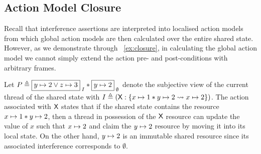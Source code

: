 \subsection{Action Model Closure}
Recall that interference assertions are interpreted into localised action models from which global action models are then calculated over the entire shared state. However, as we demonstrate through \ex~\ref{ex:closure}, in calculating the global action model we cannot simply extend the action pre- and post-conditions with arbitrary frames. 
%
\begin{example}[]\label{ex:closure}
Let $P \triangleq \boxed{y \mapsto 2 \lor z \mapsto 3}_{\; I} * \boxed{y \mapsto 2}_{\; \emptyset}$ denote the subjective view of the current thread of the shared state with $I \triangleq (\textsf{X}: \left\{x \mapsto 1 * y \mapsto 2 \rightsquigarrow x \mapsto 2\right\})$. The action associated with $\textsf{X}$ states that if the shared state contains the resource $x \mapsto 1 * y \mapsto 2$, then a thread in possession of the $\textsf{X}$ resource can update the value of $x$ such that $x \mapsto 2$ and claim the $y \mapsto 2$ resource by moving it into its local state. On the other hand, $y \mapsto 2$ is an immutable shared resource since its associated interference corresponds to $\emptyset$.


\end{example}
